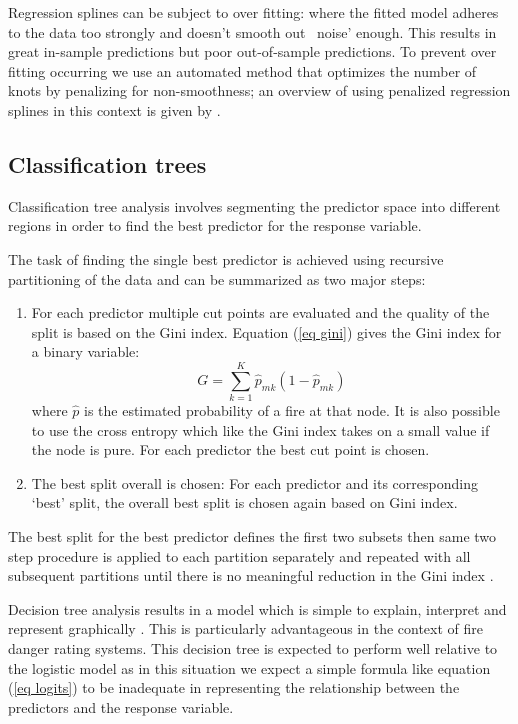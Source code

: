 \documentclass{article}
\begin{document}
Regression splines can be subject to over fitting: where the fitted model adheres to the data too strongly and doesn't smooth out ~noise' enough. This results in great in-sample predictions but poor out-of-sample predictions. To prevent over fitting occurring we use an automated method that optimizes the number of knots by penalizing for non-smoothness; an overview of using penalized regression splines in this context is given by \citet{wood02}. 

\subsection{Classification trees}

Classification tree analysis involves segmenting the predictor space into different regions in order to find the best predictor for the response variable. 

The task of finding the single best predictor is achieved using recursive partitioning of the data and can be summarized as two major steps:
\begin{enumerate}
	\item For each predictor multiple cut points are evaluated and the quality of the split is based on the Gini index. Equation (\ref{eq gini}) gives the Gini index for a binary variable:
	\begin{equation}
	\label{eq gini}
	G=\sum_{k=1}^{K} \hat{p}_{mk} (1-\hat{p}_{mk})
	\end{equation}
	where $\hat{p}$ is the estimated probability of a fire at that node. It is also possible to use the cross entropy \citep{james13} which like the Gini index takes on a small value if the node is pure. 
	For each predictor the best cut point is chosen. 
	\item The best split overall is chosen:  For each predictor and its corresponding ‘best’ split, the overall best split is chosen again based on Gini index. 
\end{enumerate}

The best split for the best predictor defines the first two subsets then same two step procedure is applied to each partition separately and repeated with all subsequent partitions until there is no meaningful reduction in the Gini index \citep{berk08,james13}. 

Decision tree analysis results in a model which is simple to explain, interpret and represent graphically \citep{james13}. This is particularly advantageous in the context of fire danger rating systems.
This decision tree is expected to perform well relative to the logistic model as in this situation we expect a simple formula like equation (\ref{eq logits}) to be inadequate in representing the relationship between the predictors and the response variable.  
\end{document}
